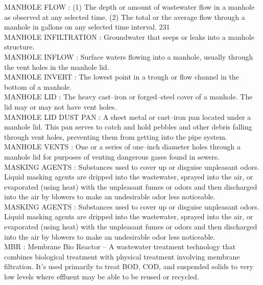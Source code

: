 \vspace{0.15cm}
MANHOLE FLOW :  (1) The depth or amount of wastewater flow in a manhole as observed at any selected time. (2) The total or the average flow through a manhole in gallons on any selected time interval. 231 \\
\vspace{0.15cm}
MANHOLE INFILTRATION :  Groundwater that seeps or leaks into a manhole structure. \\
\vspace{0.15cm}
MANHOLE INFLOW :  Surface waters flowing into a manhole, usually through the vent holes in the manhole lid. \\
\vspace{0.15cm}
MANHOLE INVERT :  The lowest point in a trough or flow channel in the bottom of a manhole. \\
\vspace{0.15cm}
MANHOLE LID :  The heavy cast–iron or forged–steel cover of a manhole. The lid may or may not have vent holes. \\
\vspace{0.15cm}
MANHOLE LID DUST PAN :  A sheet metal or cast–iron pan located under a manhole lid. This pan serves to catch and hold pebbles and other debris falling through vent holes, preventing them from getting into the pipe system. \\
\vspace{0.15cm}
MANHOLE VENTS :  One or a series of one–inch diameter holes through a manhole lid for purposes of venting dangerous gases found in sewers. \\
\vspace{0.15cm}
MASKING AGENTS :  Substances used to cover up or disguise unpleasant odors. Liquid masking agents are dripped into the wastewater, sprayed into the air, or evaporated (using heat) with the unpleasant fumes or odors and then discharged into the air by blowers to make an undesirable odor less noticeable.\\
\vspace{0.15cm}
MASKING AGENTS :  Substances used to cover up or disguise unpleasant odors. Liquid masking agents are dripped into the wastewater, sprayed into the air, or evaporated (using heat) with the unpleasant fumes or odors and then discharged into the air by blowers to make an undesirable odor less noticeable.\\
\vspace{0.15cm}
MBR :  Membrane Bio Reactor –  A wastewater treatment technology that combines biological treatment with physical treatment involving membrane filtration. It’s used primarily to treat BOD, COD, and suspended solids to very low levels where effluent may be able to be reused or recycled.\\
